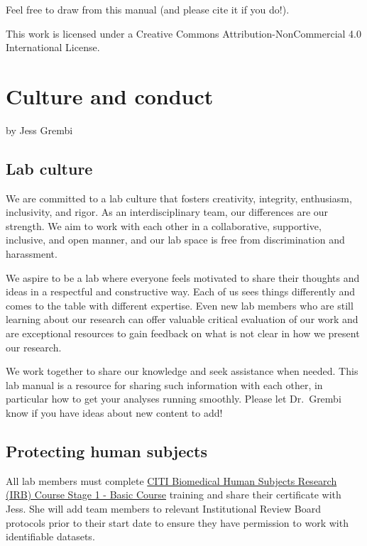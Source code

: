 \documentclass[
]{book}
\begin{document}
Feel free to draw from this manual (and please cite it if you do!).

This work is licensed under a Creative Commons Attribution-NonCommercial 4.0 International License.

\chapter{Culture and conduct}\label{culture-and-conduct}

by Jess Grembi

\section{Lab culture}\label{lab-culture}

We are committed to a lab culture that fosters creativity, integrity, enthusiasm, inclusivity, and rigor. As an interdisciplinary team, our differences are our strength. We aim to work with each other in a collaborative, supportive, inclusive, and open manner, and our lab space is free from discrimination and harassment.

We aspire to be a lab where everyone feels motivated to share their thoughts and ideas in a respectful and constructive way. Each of us sees things differently and comes to the table with different expertise. Even new lab members who are still learning about our research can offer valuable critical evaluation of our work and are exceptional resources to gain feedback on what is not clear in how we present our research.

We work together to share our knowledge and seek assistance when needed. This lab manual is a resource for sharing such information with each other, in particular how to get your analyses running smoothly. Please let Dr.~Grembi know if you have ideas about new content to add!

\section{Protecting human subjects}\label{protecting-human-subjects}

All lab members must complete \href{https://citi.psu.edu}{CITI Biomedical Human Subjects Research (IRB) Course Stage 1 - Basic Course} training and share their certificate with Jess. She will add team members to relevant Institutional Review Board protocols prior to their start date to ensure they have permission to work with identifiable datasets.
\end{document}
